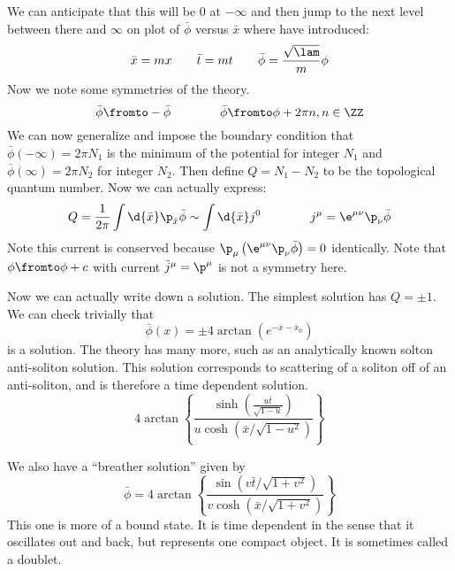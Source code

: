 \documentclass{booc}
\begin{document}
We can anticipate that this will be $0$ at $-\infty$ and then
jump to the next level between there and $\infty$ on plot of $\bar\phi$ versus $\bar x$
where have introduced:
\begin{equation}
\bar x = mx
\qquad
\bar t = mt
\qquad
\bar \phi = \frac{\sqrt{\lam}}{m} \phi
\end{equation}
Now we note some symmetries of the theory.
\begin{equation}
\bar \phi \fromto -\bar \phi
\qquad\qquad
\bar \phi \fromto \phi + 2\pi n , n\in \ZZ
\end{equation}
We can now generalize and impose the boundary condition that
$\bar \phi\left( -\infty \right) = 2\pi N_1$ 
is the minimum of the potential for integer $N_1$
and $\bar \phi\left( \infty \right) = 2\pi N_2$ for integer $N_2$.
Then define $Q = N_1 - N_2$ to be the topological quantum number. Now we can actually express:
\begin{equation}
Q= \frac{1}{2\pi} \int \d{\bar x} \p_{\bar x} \bar \phi
\sim \int \d{\bar x} j^0
\qquad\qquad
j^\mu = \e^{\mu\nu} \p_\nu \bar \phi
\end{equation}
Note this current
is conserved because $\p_\mu\left( \e^{\mu\nu}\p_\nu \bar \phi \right) = 0$
identically.
Note that $\phi \fromto \phi+c$ with current $\tilde j^\mu = \p^\mu$ is not a symmetry here.

Now we can actually write down a solution.
The simplest solution has $Q = \pm 1$. 
We can check trivially that
\begin{equation}
\bar \phi\left( x \right) = 
\pm 4 \arctan\left( e^{-\bar x - \bar x_0} \right)
\end{equation}
is a solution.
The theory has many more, such as an analytically known solton anti-soliton solution.
This solution corresponds to scattering of a soliton off of an anti-soliton, 
and is therefore a time dependent solution.
\begin{equation}
4\arctan\left\{ 
\frac{
\sinh\left( 
\frac{u\bar t}{\sqrt{1 - u}}
\right)}{
u\cosh\left( \bar x / \sqrt{1 - u^2} \right)}
\right\}
\end{equation}

We also have a ``breather solution'' given by
\begin{equation}
\bar \phi = 4\arctan\left\{ 
\frac{
\sin\left( v \bar t / \sqrt{1 + v^2} \right)
}{
v\cosh\left( \bar x  / \sqrt{1 + v^2} \right)
}
\right\}
\end{equation}
This one is more of a bound state. 
It is time dependent in the sense that it oscillates out and back, 
but represents one compact object. It is sometimes called a doublet.
\end{document}
